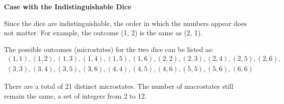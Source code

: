 \textbf{Case with the Indistinguishable Dice}

Since the dice are indistinguishable, the order in which the numbers appear does not matter. For example, the outcome (1, 2) is the same as (2, 1). 

The possible outcomes (microstates) for the two dice can be listed as:
\[
\begin{array}{l}
(1,1), (1,2), (1,3), (1,4), (1,5), (1,6), (2,2), (2,3), (2,4), (2,5), (2,6), \\
(3,3), (3,4), (3,5), (3,6), (4,4), (4,5), (4,6), (5,5), (5,6), (6,6)
\end{array}
\]

There are a total of 21 distinct microstates. The number of macrostates still remain the same, a set of integers from 2 to 12. 




